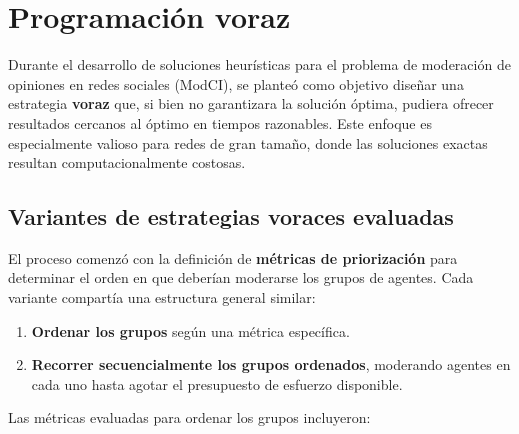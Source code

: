 




\maketitle


\tableofcontents

\clearpage


\section{Programación voraz}

Durante el desarrollo de soluciones heurísticas para el problema de moderación de opiniones en redes sociales (ModCI), se planteó como objetivo diseñar una estrategia \textbf{voraz} que, si bien no garantizara la solución óptima, pudiera ofrecer resultados cercanos al óptimo en tiempos razonables. Este enfoque es especialmente valioso para redes de gran tamaño, donde las soluciones exactas resultan computacionalmente costosas.

\subsection{Variantes de estrategias voraces evaluadas}

El proceso comenzó con la definición de \textbf{métricas de priorización} para determinar el orden en que deberían moderarse los grupos de agentes. Cada variante compartía una estructura general similar:

\begin{enumerate}
	\item \textbf{Ordenar los grupos} según una métrica específica.

	\item \textbf{Recorrer secuencialmente los grupos ordenados}, moderando agentes en cada uno hasta agotar el presupuesto de esfuerzo disponible.
\end{enumerate}

Las métricas evaluadas para ordenar los grupos incluyeron:

